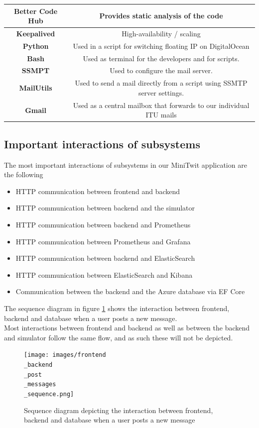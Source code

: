 \begin{center}
\begin{tabular}{||c | c ||}
 \hline
 \textbf{Better Code Hub} & Provides static analysis of the code \\
 \hline
 \textbf{Keepalived} & High-availability / scaling \\
 \hline
 \textbf{Python} & Used in a script for switching floating IP on DigitalOcean  \\
 \hline
 \textbf{Bash} & Used as terminal for the developers and for scripts.\\
 \hline
 \textbf{SSMPT} & Used to configure the mail server.\\
 \hline
 \textbf{MailUtils} & Used to send a mail directly from a script using SSMTP server settings. \\
 \hline
 \textbf{Gmail} & Used as a central mailbox that forwards to our individual ITU mails \\[1ex] 
 \hline
\end{tabular}
\end{center}

\subsection{Important interactions of subsystems}
The most important interactions of subsystems in our MiniTwit application are the following 
\begin{itemize}
    \item HTTP communication between frontend and backend
    \item HTTP communication between backend and the simulator
    \item HTTP communication between backend and Prometheus
    \item HTTP communication between Prometheus and Grafana
    \item HTTP communication between backend and ElasticSearch
    \item HTTP communication between ElasticSearch and Kibana
    \item Communication between the backend and the Azure database via EF Core
\end{itemize}

The sequence diagram in figure \ref{fig:SequenceDiagramPostMessage} shows the interaction between frontend, backend and database when a user posts a new message. \\
Most interactions between frontend and backend as well as between the backend and simulator follow the same flow, and as such these will not be depicted.

\begin{figure}[H]
 \centering
 \texttt{[image: images/frontend\\\_backend\\\_post\\\_messages\\\_sequence.png]}
 \caption{Sequence diagram depicting the interaction between frontend, backend and database when a user posts a new message}
 \label{fig:SequenceDiagramPostMessage}
\end{figure}

